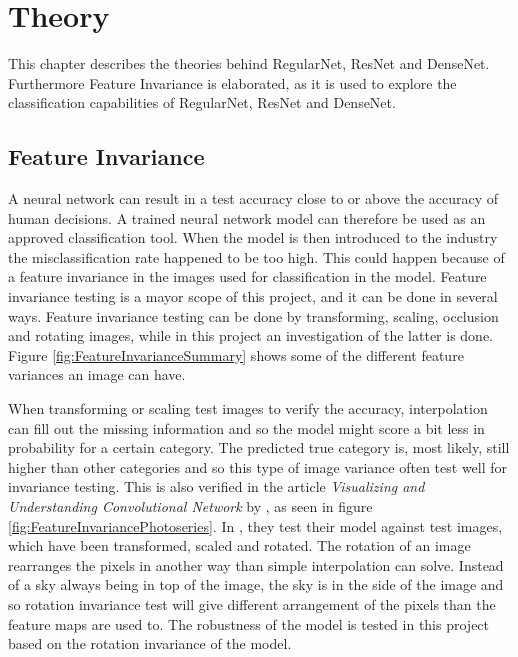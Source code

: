 \chapter{Theory}
\label{chp:theory}

This chapter describes the theories behind RegularNet, ResNet and DenseNet. Furthermore Feature Invariance is elaborated, as it is used to explore the classification capabilities of RegularNet, ResNet and DenseNet.

\section{Feature Invariance}
A neural network can result in a test accuracy close to or above the accuracy of human decisions. A trained neural network model can therefore be used as an approved classification tool. When the model is then introduced to the industry the misclassification rate happened to be too high. This could happen because of a feature invariance in the images used for classification in the model. Feature invariance testing is a mayor scope of this project, and it can be done in several ways. Feature invariance testing can be done by transforming, scaling, occlusion and rotating images, while in this project an investigation of the latter is done. Figure \ref{fig:FeatureInvarianceSummary} shows some of the different feature variances an image can have.

\FloatBarrier

When transforming or scaling test images to verify the accuracy, interpolation can fill out the missing information and so the model might score a bit less in probability for a certain category. The predicted true category is, most likely, still higher than other categories and so this type of image variance often test well for invariance testing. This is also verified in the article \textit{Visualizing and Understanding Convolutional Network} by \citet{Visualizing}, as seen in figure \ref{fig:FeatureInvariancePhotoseries}. In \citet{Visualizing}, they test their model against test images, which have been transformed, scaled and rotated. The rotation of an image rearranges the pixels in another way than simple interpolation can solve. Instead of a sky always being in top of the image, the sky is in the side of the image and so rotation invariance test will give different arrangement of the pixels than the feature maps are used to. The robustness of the model is tested in this project based on the rotation invariance of the model.

\FloatBarrier







